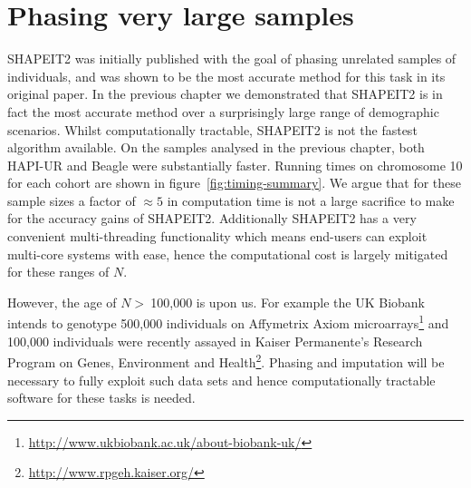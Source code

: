 
\chapter{Phasing very large samples}

SHAPEIT2 was initially published with the goal of phasing unrelated samples of individuals, and was shown to be the most accurate method for this task in its original paper. In the previous chapter we demonstrated that SHAPEIT2 is in fact the most accurate method over a surprisingly large range of demographic scenarios.  Whilst computationally tractable, SHAPEIT2 is not the fastest algorithm available.  On the samples analysed in the previous chapter, both HAPI-UR and Beagle were substantially faster.  Running times on chromosome 10 for each cohort are shown in figure~\ref{fig:timing-summary}.  We argue that for these sample sizes a factor of $\approx5$ in computation time is not a large sacrifice to make for the accuracy gains of SHAPEIT2.  Additionally SHAPEIT2 has a very convenient multi-threading functionality which means end-users can exploit multi-core systems with ease, hence the computational cost is largely mitigated for these ranges of $N$.

However, the age of $N>~$100,000 is upon us. For example the UK Biobank intends to genotype 500,000 individuals on Affymetrix Axiom microarrays\footnote{\url{http://www.ukbiobank.ac.uk/about-biobank-uk/}} and 100,000 individuals were recently assayed in Kaiser Permanente's Research Program on Genes, Environment and Health\footnote{{\url{http://www.rpgeh.kaiser.org/}}}. Phasing and imputation will be necessary to fully exploit such data sets and hence computationally tractable software for these tasks is needed.

